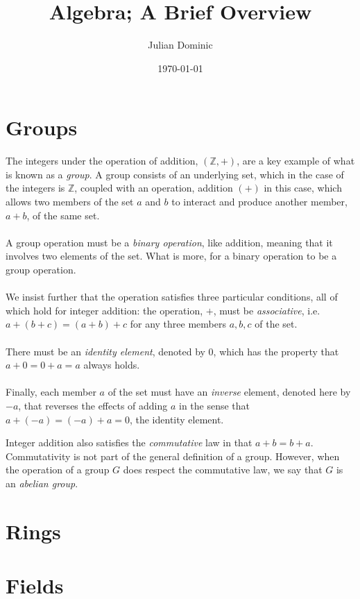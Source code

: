 \documentclass[../setup.tex]{subfiles}
\begin{document}
\title{Algebra; A Brief Overview}
\author{Julian Dominic}
\date{\today}
\maketitle
\clearpage

\setcounter{page}{1}
\section{Groups}
The integers under the operation of addition, $(\mathbb{Z}, +)$, are a key example of what is known as a \textit{group}. A group consists of an underlying set, which in the case of the integers is $\mathbb{Z}$, coupled with an operation, addition $(+)$ in this case, which allows two members of the set $a$ and $b$ to interact and produce another member, $a + b$, of the same set.  \\ \\
A group operation must be a \textit{binary operation}, like addition, meaning that it involves two elements of the set. What is more, for a binary operation to be a group operation. \\ \\ 
We insist further that the operation satisfies three particular conditions, all of which hold for integer addition: the operation, $+$, must be \textit{associative}, i.e. $a + (b + c) = (a + b) + c$ for any three members $a, b, c$ of the set. \\ \\
There must be an \textit{identity element}, denoted by $0$, which has the property that $a + 0 = 0 + a = a$ always holds. \\ \\
Finally, each member $a$ of the set must have an \textit{inverse} element, denoted here by $-a$, that reverses the effects of adding $a$ in the sense that $a + (-a) = (-a) + a = 0$, the identity element. \\ 

\begin{remark}
Integer addition also satisfies the \textit{commutative} law in that $a + b = b + a$. Commutativity is not part of the general definition of a group. However, when the operation of a group $G$ does respect the commutative law, we say that $G$ is an \textit{abelian group}.
\end{remark}

\section{Rings}
\section{Fields}
\end{document}
